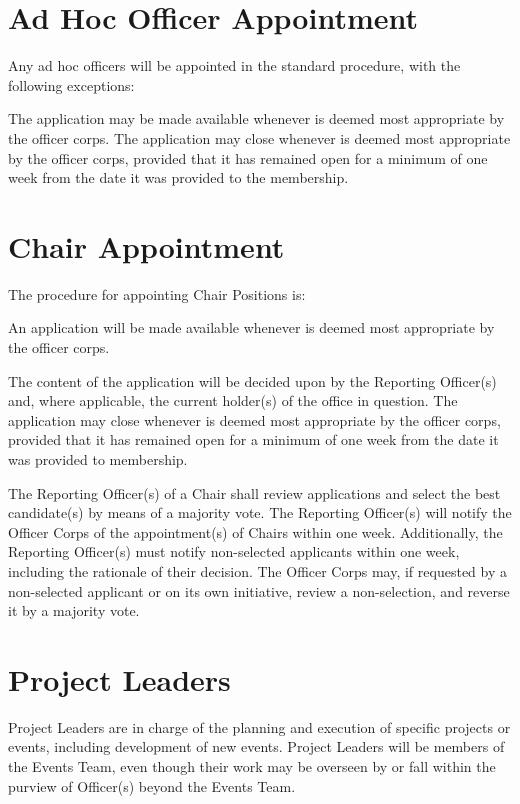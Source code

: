 \section{Ad Hoc Officer Appointment}
Any ad hoc officers will be appointed in the standard procedure, with the following exceptions:\label{sec:adhocofficerapt}
\begin{enumsubsection}
\itemnotoc The application may be made available whenever is deemed most appropriate by the officer corps.
\itemnotoc The application may close whenever is deemed most appropriate by the officer corps, provided that it has remained open for a minimum of one week from the date it was provided to the membership.
\end{enumsubsection}

\section{Chair Appointment}
The procedure for appointing Chair Positions is:
\begin{enumsubsection}
\itemnotoc An application will be made available whenever is deemed most appropriate by the officer corps.
\begin{enumsubsubsection}
\itemnotoc The content of the application will be decided upon by the Reporting Officer(s) and, where applicable, the current holder(s) of the office in question.
\itemnotoc The application may close whenever is deemed most appropriate by the officer corps, provided that it has remained open for a minimum of one week from the date it was provided to membership.
\end{enumsubsubsection}
\itemnotoc The Reporting Officer(s) of a Chair shall review applications and select the best candidate(s) by means of a majority vote.
\itemnotoc The Reporting Officer(s) will notify the Officer Corps of the appointment(s) of Chairs within one week.
Additionally, the Reporting Officer(s) must notify non-selected applicants within one week, including the rationale of their decision.
\itemnotoc The Officer Corps may, if requested by a non-selected applicant or on its own initiative, review a non-selection, and reverse it by a majority vote.

\end{enumsubsection}

\section{Project Leaders}
\label{sec:ProjectLeaderes} Project Leaders are in charge of the planning and execution of specific projects or events, including development of new events.
Project Leaders will be members of the Events Team, even though their work may be overseen by or fall within the purview of Officer(s) beyond the Events Team.

